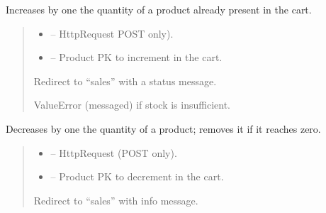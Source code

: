 \documentclass[a4paper,11pt,spanish]{sphinxmanual}
\begin{document}
\begin{fulllineitems}
\label{\detokenize{api/sale/sale.views:sale.views.add_qty}}
\pysigstartsignatures
\pysiglinewithargsret
{}
{\sphinxparamcomma {}}
{}
\pysigstopsignatures
\sphinxAtStartPar
Increases by one the quantity of a product already present in the cart.
\begin{quote}\begin{description}
\begin{itemize}
\item {} 
\sphinxAtStartPar
{} – HttpRequest POST only).

\item {} 
\sphinxAtStartPar
{} – Product PK to increment in the cart.

\end{itemize}

\sphinxAtStartPar
Redirect to “sales” with a status message.

\sphinxAtStartPar
ValueError (messaged) if stock is insufficient.

\end{description}\end{quote}

\end{fulllineitems}


\begin{fulllineitems}
\label{\detokenize{api/sale/sale.views:sale.views.dec_qty}}
\pysigstartsignatures
\pysiglinewithargsret
{}
{\sphinxparamcomma {}}
{}
\pysigstopsignatures
\sphinxAtStartPar
Decreases by one the quantity of a product; removes it if it reaches zero.
\begin{quote}\begin{description}
\begin{itemize}
\item {} 
\sphinxAtStartPar
{} – HttpRequest (POST only).

\item {} 
\sphinxAtStartPar
{} – Product PK to decrement in the cart.

\end{itemize}

\sphinxAtStartPar
Redirect to “sales” with info message.

\end{description}\end{quote}

\end{fulllineitems}
\end{document}
